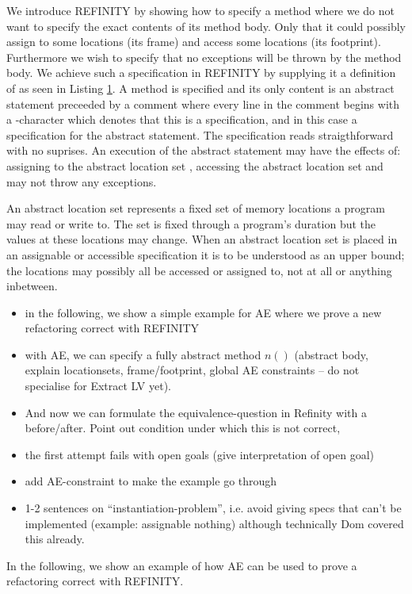 We introduce REFINITY by showing how to specify a method  where we do not want to specify the exact contents of its method body.
Only that it could possibly assign to some locations (its frame) and access some locations (its footprint).
Furthermore we wish to specify that no exceptions will be thrown by the method body.
We achieve such a specification in REFINITY by supplying it a definition of  as seen in Listing \ref{lst:ExtractVariable-refinity-method}.
A method is specified and its only content is an abstract statement  preceeded by a comment where every line in the
comment begins with a -character which denotes that this is a specification, and in this case a specification for the abstract statement.
The specification reads straigthforward with no suprises. An execution of the abstract statement  may have the effects of: assigning to the
abstract location set , accessing the abstract location set  and may not throw any exceptions.

An abstract location set represents a fixed set of memory locations a program may read or write to.
The set is fixed through a program's duration but the values at these locations may change.
When an abstract location set is placed in an assignable or accessible specification it is to be understood as an upper bound;
the locations may possibly all be accessed or assigned to, not at all or anything inbetween.

\begin{figure}[h]
  \centering
  \begin{minipage}{.65\linewidth}
  
  \label{lst:ExtractVariable-refinity-method}
  \end{minipage}
\end{figure}


\begin{itemize}
\item in the following, we show a simple example for AE where we prove a new refactoring correct with REFINITY
\item with AE, we can specify a fully abstract method $n()$ (abstract body, explain locationsets, frame/footprint, global AE constraints -- do not specialise for Extract LV yet).
\item And now we can formulate the equivalence-question in Refinity with a before/after. Point out condition under which this is not correct,
\item the first attempt fails with open goals (give interpretation of open goal)
\item add AE-constraint to make the example go through
\item 1-2 sentences on ``instantiation-problem'', i.e. avoid giving specs that can't be implemented (example: assignable nothing) although technically Dom covered this already.
\end{itemize}

In the following, we show an example of how AE can be used to prove a refactoring correct with REFINITY. 

